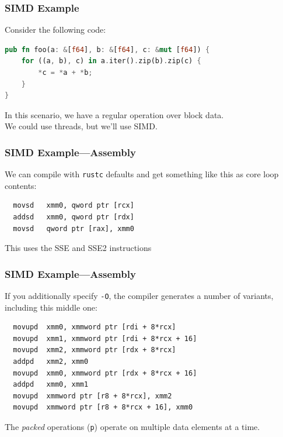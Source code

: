 \begin{frame}[fragile]
  \frametitle{SIMD Example}

  
  Consider the following code:

\begin{lstlisting}[language=Rust]
pub fn foo(a: &[f64], b: &[f64], c: &mut [f64]) {
    for ((a, b), c) in a.iter().zip(b).zip(c) {
        *c = *a + *b;
    }
}\end{lstlisting}

    In this scenario, we have a regular operation over block data.\\[1em]

    We could use threads, but we'll use SIMD.

  
\end{frame}

\begin{frame}[fragile]
  \frametitle{SIMD Example---Assembly}

We can compile with \texttt{rustc} defaults
and get something like this as core loop contents:
\begin{verbatim}
  movsd   xmm0, qword ptr [rcx]
  addsd   xmm0, qword ptr [rdx]
  movsd   qword ptr [rax], xmm0
\end{verbatim}

This uses the SSE and SSE2 instructions
  
\end{frame}


\begin{frame}[fragile]
  \frametitle{SIMD Example---Assembly}

  If you additionally specify \texttt{-O}, the compiler generates a number of variants, including this middle one:
\begin{verbatim}
  movupd  xmm0, xmmword ptr [rdi + 8*rcx]
  movupd  xmm1, xmmword ptr [rdi + 8*rcx + 16]
  movupd  xmm2, xmmword ptr [rdx + 8*rcx]
  addpd   xmm2, xmm0
  movupd  xmm0, xmmword ptr [rdx + 8*rcx + 16]
  addpd   xmm0, xmm1
  movupd  xmmword ptr [r8 + 8*rcx], xmm2
  movupd  xmmword ptr [r8 + 8*rcx + 16], xmm0
\end{verbatim}

The \emph{packed} operations ({\tt p}) operate on multiple data
elements at a time.
\end{frame}


